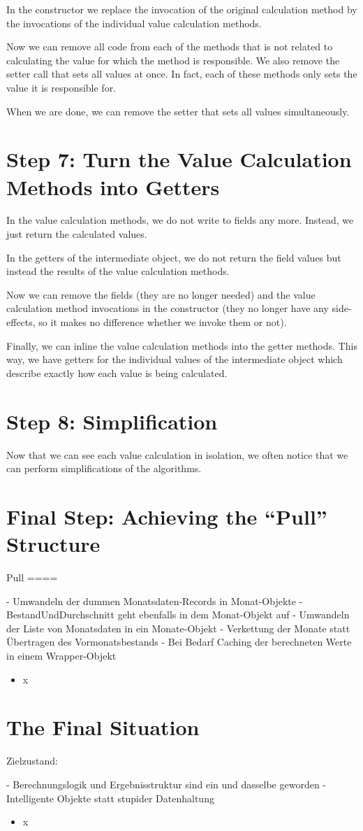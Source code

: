 \documentclass[a4paper,fleqn,titlepage,11pt]{article}
\begin{document}
In the constructor we replace the invocation of the original calculation method by the invocations of the individual value calculation methods.

Now we can remove all code from each of the methods that is not related to calculating the value for which the method is responsible. We also remove the setter call that sets all values at once. In fact, each of these methods only sets the value it is responsible for.

When we are done, we can remove the setter that sets all values simultaneously.

\section{Step 7: Turn the Value Calculation Methods into Getters}

In the value calculation methods, we do not write to fields any more. Instead, we just return the calculated values.

In the getters of the intermediate object, we do not return the field values but instead the results of the value calculation methods.

Now we can remove the fields (they are no longer needed) and the value calculation method invocations in the constructor (they no longer have any side-effects, so it makes no difference whether we invoke them or not).

Finally, we can inline the value calculation methods into the getter methods. This way, we have getters for the individual values of the intermediate object which describe exactly how each value is being calculated.

\section{Step 8: Simplification}

Now that we can see each value calculation in isolation, we often notice that we can perform simplifications of the algorithms. 

\section{Final Step: Achieving the ``Pull'' Structure}



Pull
====

- Umwandeln der dummen Monatsdaten-Records in Monat-Objekte
- BestandUndDurchschnitt geht ebenfalls in dem Monat-Objekt auf
- Umwandeln der Liste von Monatsdaten in ein Monate-Objekt
- Verkettung der Monate statt Übertragen des Vormonatsbestands
- Bei Bedarf Caching der berechneten Werte in einem Wrapper-Objekt

\begin{itemize}
\item x
\end{itemize}

\section{The Final Situation}

Zielzustand:

- Berechnungslogik und Ergebnisstruktur sind ein und dasselbe geworden
- Intelligente Objekte statt stupider Datenhaltung

\begin{itemize}
\item x
\end{itemize}
\end{document}
